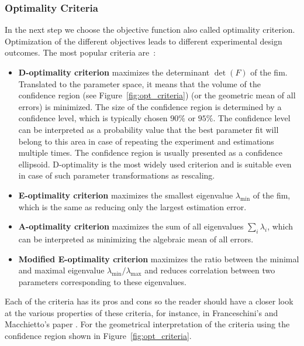 \documentclass[graybox]{svmult}
\begin{document}
\subsubsection*{Optimality Criteria}
In the next step we choose the objective function also called optimality criterion.
Optimization of the different objectives leads to different experimental design outcomes.
The most popular criteria are~\cite{balsa-cantoe.bangaj.r.COMPUTINGOPTIMALDYNAMIC2008, dette_designing_1997, walter_qualitative_1990}:
\begin{itemize}
\item \textbf{D-optimality criterion} maximizes the determinant $\det (F)$ of the \ac{fim}.
 Translated to the parameter space, it means that the volume of the confidence region (see Figure~\ref{fig:opt_criteria}) (or the geometric mean of all errors) is minimized.
 The size of the confidence region is determined by a confidence level, which is typically chosen $90 \%$ or $95 \%$.
 The confidence level can be interpreted as a probability value that the best
 parameter fit will belong to this area in case of repeating the experiment and estimations multiple times.
 The confidence region is usually presented as a confidence ellipsoid.
 D-optimality is the most widely used criterion and is suitable even in case of such parameter transformations as rescaling.
\item \textbf{E-optimality criterion} maximizes the smallest eigenvalue $\lambda_{\min}$ of the \ac{fim}, which is the same as reducing only the largest estimation error.
\item \textbf{A-optimality criterion} maximizes the sum of all eigenvalues $\sum_i \lambda_i$, which can be interpreted as minimizing the algebraic mean of all errors.
\item \textbf{Modified E-optimality criterion} maximizes the ratio between the minimal and maximal eigenvalue $\lambda_{\min} / \lambda_{\max}$ and reduces correlation between two parameters corresponding to these eigenvalues.

\end{itemize}
Each of the criteria has its pros and cons so the reader should have a closer look at the various properties of these criteria, for instance, in Franceschini's and Macchietto's paper \cite{franceschiniModelbasedDesignExperiments2008}.
For the geometrical interpretation of the criteria using the confidence region shown in Figure~\ref{fig:opt_criteria}.
%
%
\end{document}
